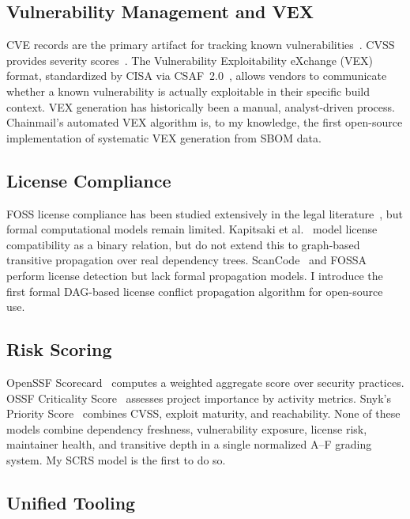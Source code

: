 \documentclass[11pt,twocolumn]{article}
\begin{document}
\subsection{Vulnerability Management and VEX}

CVE records are the primary artifact for tracking known
vulnerabilities~\cite{mitre2024cve}. CVSS provides severity
scores~\cite{cvss}. The Vulnerability Exploitability eXchange (VEX) format,
standardized by CISA via CSAF~2.0~\cite{csaf20}, allows vendors to communicate
whether a known vulnerability is actually exploitable in their specific build
context. VEX generation has historically been a manual, analyst-driven process.
Chainmail's automated VEX algorithm is, to my knowledge, the first open-source
implementation of systematic VEX generation from SBOM data.

\subsection{License Compliance}

FOSS license compliance has been studied extensively in the legal
literature~\cite{rosen2005}, but formal computational models remain limited.
Kapitsaki et al.~\cite{kapitsaki2017} model license compatibility as a binary
relation, but do not extend this to graph-based transitive propagation over real
dependency trees. ScanCode~\cite{scancode} and FOSSA~\cite{fossa} perform license
detection but lack formal propagation models. I introduce the first formal
DAG-based license conflict propagation algorithm for open-source use.

\subsection{Risk Scoring}

OpenSSF Scorecard~\cite{scorecard} computes a weighted aggregate score over
security practices. OSSF Criticality Score~\cite{criticality} assesses project
importance by activity metrics. Snyk's Priority Score~\cite{snyk} combines CVSS,
exploit maturity, and reachability. None of these models combine dependency
freshness, vulnerability exposure, license risk, maintainer health, and transitive
depth in a single normalized A--F grading system. My SCRS model is the first to
do so.

\subsection{Unified Tooling}
\end{document}
